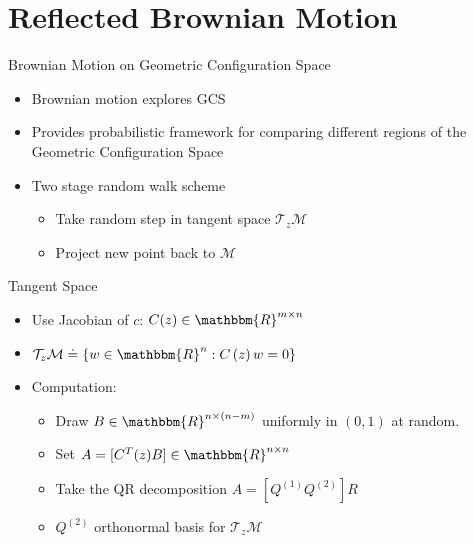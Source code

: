 \documentclass{beamer}
\begin{document}
\section{Reflected Brownian Motion}
\begin{frame}{Brownian Motion on Geometric Configuration Space}
\begin{itemize}
\item Brownian motion explores GCS 
\item Provides probabilistic framework for comparing different regions of the Geometric Configuration Space
\item Two stage random walk scheme
\begin{itemize}
 \item Take random step in tangent space $\mathcal{T}_z\mathcal{M}$
  \item Project new point back to $\mathcal{M}$
\end{itemize}
\end{itemize}
\end{frame}
\begin{frame}{Tangent Space}
\begin{itemize}
\item Use Jacobian of $c$: $C(z) \in \mathbbm{R}^{m\times n}$
\item $\mathcal{T}_z\mathcal{M} \doteq \left\{w \in \mathbbm{R}^n : C\left(z\right)w = 0\right\}$ 
\item Computation:
\begin{itemize}
\item Draw $B \in \mathbbm{R}^{n\times (n-m)}$ uniformly in $(0,1)$ at random.
\item Set $A = [C^T(z) B] \in \mathbbm{R}^{n\times n}$
\item Take the QR decomposition $A = [Q^{(1)} Q^{(2)}]R$
\item $Q^{(2)}$ orthonormal basis for $\mathcal{T}_z\mathcal{M}$ 
\end{itemize}
\end{itemize}
\end{frame}
\end{document}
